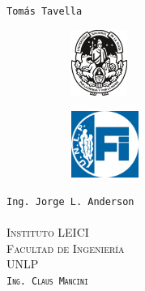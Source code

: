 \begin{titlepage}
\begin{center}
            \vspace{0.2cm}
            \texttt{Tomás Tavella}
            \vfill
            \begin{figure}[H]
                \centering
                \hspace{2.5em}
                \begin{subfigure}
                    \centering
                    \includegraphics[width=0.2\textwidth]{Imagenes/UNLP.pdf}
                \end{subfigure}
                \hspace{4em}
                \begin{subfigure}
                    \centering
                    \includegraphics[width=0.24\textwidth]{Imagenes/FI Invertido.png}
                \end{subfigure}
            \end{figure}
            \vspace{0.5cm}
            \begin{multicols}{3}
                \large
                \texttt{Ing. Jorge L. Anderson}
                \\
                \vspace{0.1cm}
                \Large\scshape
                \\
                \normalfont
            \columnbreak
                \Bold\large\scshape
                Instituto LEICI
                \\
                \vspace{0.1cm}
                Facultad de Ingeniería
                \\
                \vspace{0.1cm}
                UNLP
                \\
            \columnbreak
                \vspace{0.1cm}
                \normalfont\large
                \texttt{Ing. Claus Mancini}
                \\
                \vspace{0.1cm}
                \Large\scshape
                \normalfont
            \end{multicols}
        \end{center}
    \end{titlepage}